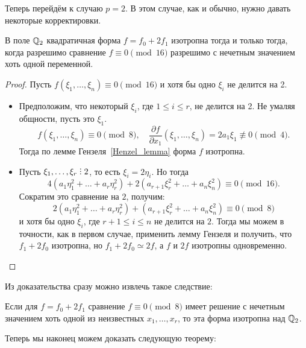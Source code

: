 	Теперь перейдём к случаю $p = 2$. В этом случае, как и обычно, нужно давать некоторые корректировки. 

	\begin{theorem} 
		В поле $\mathbb{Q}_{2}$ квадратичная форма $f = f_0 + 2f_1$ изотропна тогда и только тогда, когда разрешимо сравнение $f \equiv 0 \pmod{16}$ разрешимо с нечетным значением хоть одной переменной. 
	\end{theorem}
	\begin{proof}
		Пусть $f(\xi_1, \ldots, \xi_n) \equiv 0 \pmod{16}$ и хотя бы одно $\xi_i$ не делится на 2. 
		\begin{itemize}
			\item  Предположим, что некоторый $\xi_i$, где $1 \le i \le r$, не делится на 2. Не умаляя общности, пусть это $\xi_1$. 
			\[
				f(\xi_1, \ldots, \xi_n) \equiv 0 \pmod{8}, \quad \frac{\partial f}{\partial x_1}(\xi_1, \ldots, \xi_n) = 2a_1\xi_1 \not\equiv 0 \pmod{4}.
			\]
			Тогда по лемме Гензеля~\ref{Henzel_lemma} форма $f$ изотропна. 
			\item Пусть $\xi_1, \ldots, \xi_r \divby 2$, то есть $\xi_i = 2\eta_i$.  Но тогда 
			\[
				4 (a_1 \eta_1^2 + \ldots + a_r \eta_r^2) + 2 (a_{r + 1} \xi_r^2 + \ldots + a_n \xi_n^2) \equiv 0 \pmod{16}.
			\]
			Сократим это сравнение на $2$, получим: 
			\[
				2 (a_1 \eta_1^2 + \ldots + a_r \eta_r^2) +  (a_{r + 1} \xi_r^2 + \ldots + a_n \xi_n^2) \equiv 0 \pmod{8}
			\]
			и хотя бы одно $\xi_{i}$, где $r + 1 \le i \le n$ не делится на $2$. Тогда мы можем в точности, как в первом случае, применить лемму Гензеля и получить, что $f_1 + 2f_0$ изотропна, но $f_1 + 2 f_0 \simeq 2f$, а $f$ и $2f$ изотропны одновременно. 
		\end{itemize}
	\end{proof}

	Из доказательства сразу можно извлечь такое следствие:
	\begin{corollary}\label{fmod8}
		Если для $f = f_0 + 2f_1$ сравнение $f \equiv 0 \pmod{8}$ имеет решение с нечетным значением хоть одной из неизвестных $x_1, \ldots, x_r$, то эта форма изотропна над $\mathbb{Q}_{2}$. 
	\end{corollary}
	
	Теперь мы наконец можем доказать следующую теорему: 

